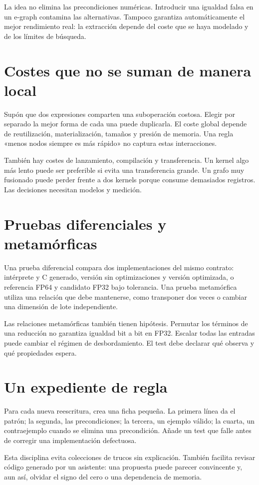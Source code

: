 \documentclass[12pt,a4paper,oneside]{report}
\begin{document}
La idea no elimina las precondiciones numéricas. Introducir una igualdad falsa en un e-graph contamina las alternativas. Tampoco garantiza automáticamente el mejor rendimiento real: la extracción depende del coste que se haya modelado y de los límites de búsqueda.

\section{Costes que no se suman de manera local}
Supón que dos expresiones comparten una suboperación costosa. Elegir por separado la mejor forma de cada una puede duplicarla. El coste global depende de reutilización, materialización, tamaños y presión de memoria. Una regla «menos nodos siempre es más rápido» no captura estas interacciones.

También hay costes de lanzamiento, compilación y transferencia. Un kernel algo más lento puede ser preferible si evita una transferencia grande. Un grafo muy fusionado puede perder frente a dos kernels porque consume demasiados registros. Las decisiones necesitan modelos y medición.

\section{Pruebas diferenciales y metamórficas}
Una prueba diferencial compara dos implementaciones del mismo contrato: intérprete y C generado, versión sin optimizaciones y versión optimizada, o referencia FP64 y candidato FP32 bajo tolerancia. Una prueba metamórfica utiliza una relación que debe mantenerse, como transponer dos veces o cambiar una dimensión de lote independiente.

Las relaciones metamórficas también tienen hipótesis. Permutar los términos de una reducción no garantiza igualdad bit a bit en FP32. Escalar todas las entradas puede cambiar el régimen de desbordamiento. El test debe declarar qué observa y qué propiedades espera.

\section{Un expediente de regla}
Para cada nueva reescritura, crea una ficha pequeña. La primera línea da el patrón; la segunda, las precondiciones; la tercera, un ejemplo válido; la cuarta, un contraejemplo cuando se elimina una precondición. Añade un test que falle antes de corregir una implementación defectuosa.

Esta disciplina evita colecciones de trucos sin explicación. También facilita revisar código generado por un asistente: una propuesta puede parecer convincente y, aun así, olvidar el signo del cero o una dependencia de memoria.
\end{document}
